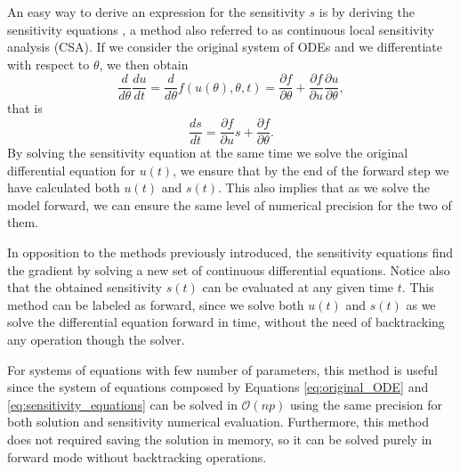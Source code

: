 An easy way to derive an expression for the sensitivity $s$ is by deriving the sensitivity equations \cite{ramsay2017dynamic}, a method also referred to as continuous local sensitivity analysis (CSA). If we consider the original system of ODEs and we differentiate with respect to $\theta$, we then obtain
\begin{equation}
 \frac{d}{d\theta} \frac{du}{dt} 
 =
 \frac{d}{d\theta} f(u(\theta), \theta, t)
 = 
 \frac{\partial f}{\partial \theta}
 + 
 \frac{\partial f}{\partial u} \frac{\partial u}{\partial \theta},
\end{equation}
that is
\begin{equation}
 \frac{ds}{dt} = \frac{\partial f}{\partial u} s + \frac{\partial f}{\partial \theta}.
 \label{eq:sensitivity_equations}
\end{equation}
By solving the sensitivity equation at the same time we solve the original differential equation for $u(t)$, we ensure that by the end of the forward step we have calculated both $u(t)$ and $s(t)$. This also implies that as we solve the model forward, we can ensure the same level of numerical precision for the two of them.

In opposition to the methods previously introduced, the sensitivity equations find the gradient by solving a new set of continuous differential equations. Notice also that the obtained sensitivity $s(t)$ can be evaluated at any given time $t$. This method can be labeled as forward, since we solve both $u(t)$ and $s(t)$ as we solve the differential equation forward in time, without the need of backtracking any operation though the solver.


For systems of equations with few number of parameters, this method is useful since the system of equations composed by Equations \eqref{eq:original_ODE} and \eqref{eq:sensitivity_equations} can be solved in $\mathcal O (np)$ using the same precision for both solution and sensitivity numerical evaluation. Furthermore, this method does not required saving the solution in memory, so it can be solved purely in forward mode without backtracking operations.

